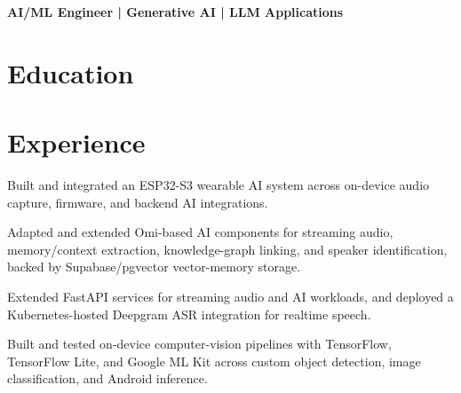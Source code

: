 \documentclass{../../../templates/v3/resume-openfont}
\begin{document}

{\small\bfseries AI/ML Engineer | Generative AI | LLM Applications}\par\vspace{2pt}

\section{Education}

\section{Experience}
\begin{resumeitemize}
\item Built and integrated an ESP32-S3 wearable AI system across on-device audio capture, firmware, and backend AI integrations.
\item Adapted and extended Omi-based AI components for streaming audio, memory/context extraction, knowledge-graph linking, and speaker identification, backed by Supabase/pgvector vector-memory storage.
\item Extended FastAPI services for streaming audio and AI workloads, and deployed a Kubernetes-hosted Deepgram ASR integration for realtime speech.
\end{resumeitemize}

\begin{resumeitemize}
\item Built and tested on-device computer-vision pipelines with TensorFlow, TensorFlow Lite, and Google ML Kit across custom object detection, image classification, and Android inference.
\end{resumeitemize}
\end{document}

